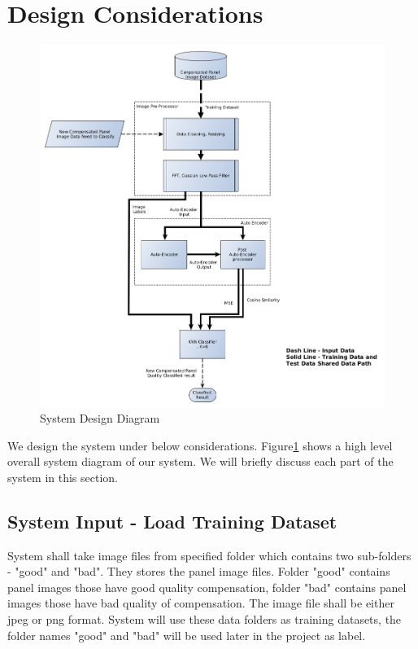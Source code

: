 \documentclass[runningheads]{llncs}
\begin{document}
\section{Design Considerations}
\begin{figure}
    \centering
    \includegraphics[width=1.0\textwidth]{system-diagram.png}
    \caption{System Design Diagram}
    \label{fig:2}
\end{figure}
We design the system under below considerations. Figure\ref{fig:2} shows a high level overall system diagram of our system. We will briefly discuss each part of the system in this section.

\subsection{System Input - Load Training Dataset}
System shall take image files from specified folder which contains two sub-folders - "good" and "bad". They stores the panel image files. Folder "good" contains panel images those have good quality compensation, folder "bad" contains panel images those have bad quality of compensation. The image file shall be either jpeg or png format. System will use these data folders as training datasets, the folder names "good" and "bad" will be used later in the project as label.
\end{document}
